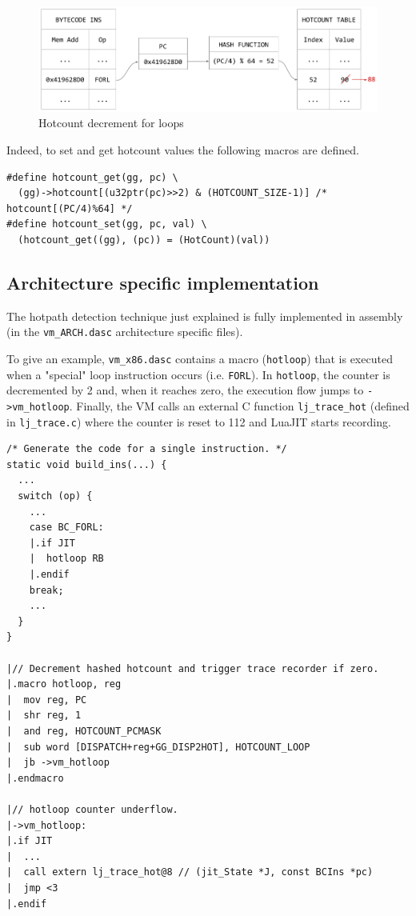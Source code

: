 \begin{figure}[H]
    \centering
	\includegraphics[width=\textwidth]{images/chapter7/HotpathDetection.png}
    \caption{Hotcount decrement for loops}
    \label{fig:hotcount}
\end{figure}

\noindent
Indeed, to set and get hotcount values the following macros are defined.

\begin{lstlisting}[style=CStyle, caption=\texttt{lj\_dispatch.h}]
#define hotcount_get(gg, pc) \
  (gg)->hotcount[(u32ptr(pc)>>2) & (HOTCOUNT_SIZE-1)] /* hotcount[(PC/4)%64] */
#define hotcount_set(gg, pc, val) \
  (hotcount_get((gg), (pc)) = (HotCount)(val))
\end{lstlisting}

\subsection{Architecture specific implementation}

The hotpath detection technique just explained is fully implemented in assembly (in the \texttt{vm\_ARCH.dasc} architecture specific files). 

To give an example, \texttt{vm\_x86.dasc} contains a macro (\texttt{hotloop}) that is executed when a "special" loop instruction occurs (i.e. \texttt{FORL}). In \texttt{hotloop}, the counter is decremented by 2 and, when it reaches zero, the execution flow jumps to \texttt{->vm\_hotloop}. Finally, the VM calls an external C function \texttt{lj\_trace\_hot} (defined in \texttt{lj\_trace.c}) where the counter is reset to 112 and LuaJIT starts recording.

\begin{lstlisting}[style=DynASMStyle, caption=\texttt{vm\_x86.dasc}]
/* Generate the code for a single instruction. */
static void build_ins(...) {
  ...
  switch (op) {
    ...
    case BC_FORL:
    |.if JIT
    |  hotloop RB
    |.endif
    break;
    ... 
  }
}

|// Decrement hashed hotcount and trigger trace recorder if zero.
|.macro hotloop, reg
|  mov reg, PC
|  shr reg, 1
|  and reg, HOTCOUNT_PCMASK
|  sub word [DISPATCH+reg+GG_DISP2HOT], HOTCOUNT_LOOP
|  jb ->vm_hotloop
|.endmacro

|// hotloop counter underflow.
|->vm_hotloop:			
|.if JIT
|  ...
|  call extern lj_trace_hot@8 // (jit_State *J, const BCIns *pc)
|  jmp <3
|.endif

\end{lstlisting}


